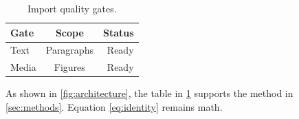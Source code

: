 \documentclass[11pt]{article}
\begin{document}
\begin{table}
  \caption{Import quality gates.}
  \label{tab:gates}
  \begin{tabular}{lcr}
    \toprule
    Gate & Scope & Status \\
    \midrule
    Text & Paragraphs & Ready \\
    Media & Figures & Ready \\
    \bottomrule
  \end{tabular}
\end{table}

As shown in \autoref{fig:architecture}, the table in \ref{tab:gates} supports
the method in \ref{sec:methods}. Equation \ref{eq:identity} remains math.
\citep[pp. 12--14]{knuth1984,lamport1994}





\end{document}
